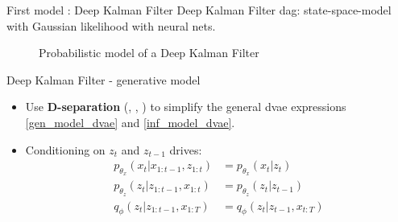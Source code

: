 \begin{frame}{First model : Deep Kalman Filter}
Deep Kalman Filter \gls{dag}: \gls{state-space-model} with Gaussian likelihood with neural nets.
    \begin{figure}[h]
            \centering
            \label{fig:graphical_model_dkf}
        \caption{Probabilistic model of a Deep Kalman Filter}
    \end{figure}
\end{frame}

\begin{frame}{Deep Kalman Filter - generative model}
    \begin{itemize}
        \item Use \textbf{D-separation} (\cite{PRML}, \cite{ProbabilisticGraphicalModels}, \cite{ProbabilisticMachineLearning}) to simplify the general \gls{dvae} expressions \ref{gen_model_dvae} and \ref{inf_model_dvae}. 
        \item Conditioning on $z_t$ and $z_{t-1}$ drives:
            \begin{align}
                p_{\theta_x}(x_t \vert x_{1:t-1}, z_{1:t}) &= p_{\theta_x}(x_t \vert z_t) \\
                p_{\theta_z}(z_t \vert z_{1:t-1}, x_{1:t}) &= p_{\theta_z}(z_t \vert z_{t-1}) \\
                \label{dkf_posterior}
                q_{\phi}(z_t \vert z_{1:t-1}, x_{1:T}) &= q_{\phi}(z_t \vert z_{t-1}, x_{t:T}) 
            \end{align}
    \end{itemize}
\end{frame}

